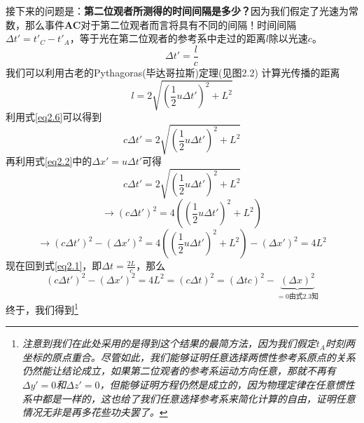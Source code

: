 接下来的问题是：{\bf{第二位观者所测得的时间间隔是多少？}}因为我们假定了光速为常数，那么事件{\bf{AC}}对于第二位观者而言将具有不同的间隔！时间间隔$\Delta t'=t'_C-t'_A$，等于光在第二位观者的参考系中走过的距离$l$除以光速$c$。
\begin{equation}\label{eq2.6}
  \Delta t'=\frac{l}{c}
\end{equation}
我们可以利用古老的Pythagoras(毕达哥拉斯)定理(见图2.2) 计算光传播的距离
\begin{equation}\label{eq2.7}
  l=2 \sqrt{\left(\frac{1}{2} u \Delta t'\right)^2+L^2}
\end{equation}
利用式\ref{eq2.6}可以得到
\begin{equation}\label{eq2.8}
  c \Delta t' =2 \sqrt{\left(\frac{1}{2} u \Delta t'\right)^2+L^2}
\end{equation}
再利用式\ref{eq2.2}中的$\Delta x'=u\Delta t'$可得
\begin{displaymath}
c \Delta t' =
  2 \sqrt{\left(\frac{1}{2} u \Delta t'\right)^2+L^2}
\end{displaymath}
\begin{displaymath}
  \rightarrow
  \left( c \Delta t' \right)^2 =
   4 \left( \left(\frac{1}{2} u \Delta t'\right)^2+L^2 \right)
\end{displaymath}
\begin{equation}\label{eq2.9}
\rightarrow
\left( c \Delta t' \right)^2
-\left(\Delta x' \right)^2=
4 \left( \left(\frac{1}{2} u \Delta t'\right)^2+L^2 \right)
-\left(\Delta x' \right)^2 =4L^2
\end{equation}
 现在回到式\ref{eq2.1}，即$\Delta t =\frac{2L}{c}$，那么
\begin{equation}\label{eq2.10}
 \left( c \Delta t' \right)^2
 -\left(\Delta x' \right)^2
 =4 L^2
 =\left( c \Delta t \right)^2
 =\left( \Delta t c \right)^2
 -
 \!\!\!
 \underbrace{\left(\Delta x \right)^2}_{=0 \text{由式}2.3 \text{知}}
\end{equation}
终于，我们得到\footnote{\it{注意到我们在此处采用的是得到这个结果的最简方法，因为我们假定$t_A$时刻两坐标的原点重合。尽管如此，我们能够证明任意选择两惯性参考系原点的关系仍然能让结论成立，如果第二位观者的参考系运动方向任意，那就不再有$\Delta y'=0$和$\Delta z'=0$，但能够证明方程仍然是成立的，因为物理定律在任意惯性系中都是一样的，这也给了我们任意选择参考系来简化计算的自由，证明任意情况无非是再多花些功夫罢了。}}

